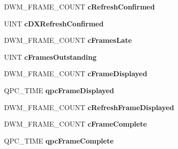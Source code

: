 \begin{DoxyCompactItemize}
D\+W\+M\+\_\+\+F\+R\+A\+M\+E\+\_\+\+C\+O\+U\+NT {\bfseries c\+Refresh\+Confirmed}
\item 
\mbox{\label{struct___d_w_m___t_i_m_i_n_g___i_n_f_o_a8c1790bb6485c12294e99a7412a6f594}} 
U\+I\+NT {\bfseries c\+D\+X\+Refresh\+Confirmed}
\item 
\mbox{\label{struct___d_w_m___t_i_m_i_n_g___i_n_f_o_a7238d2ad101d2a9b5f066f41c53abfab}} 
D\+W\+M\+\_\+\+F\+R\+A\+M\+E\+\_\+\+C\+O\+U\+NT {\bfseries c\+Frames\+Late}
\item 
\mbox{\label{struct___d_w_m___t_i_m_i_n_g___i_n_f_o_a7b3bc07f14ff355507aa1bfc4b049733}} 
U\+I\+NT {\bfseries c\+Frames\+Outstanding}
\item 
\mbox{\label{struct___d_w_m___t_i_m_i_n_g___i_n_f_o_ac4c513366b01405245adf92436f55d97}} 
D\+W\+M\+\_\+\+F\+R\+A\+M\+E\+\_\+\+C\+O\+U\+NT {\bfseries c\+Frame\+Displayed}
\item 
\mbox{\label{struct___d_w_m___t_i_m_i_n_g___i_n_f_o_ac02b071fa84081d15b2baf7ce699dab3}} 
Q\+P\+C\+\_\+\+T\+I\+ME {\bfseries qpc\+Frame\+Displayed}
\item 
\mbox{\label{struct___d_w_m___t_i_m_i_n_g___i_n_f_o_a09af01b73d4eb6acaeff7bbfc58d3792}} 
D\+W\+M\+\_\+\+F\+R\+A\+M\+E\+\_\+\+C\+O\+U\+NT {\bfseries c\+Refresh\+Frame\+Displayed}
\item 
\mbox{\label{struct___d_w_m___t_i_m_i_n_g___i_n_f_o_ab35b1e87ccfd5984610bc68525cd3a1e}} 
D\+W\+M\+\_\+\+F\+R\+A\+M\+E\+\_\+\+C\+O\+U\+NT {\bfseries c\+Frame\+Complete}
\item 
\mbox{\label{struct___d_w_m___t_i_m_i_n_g___i_n_f_o_a7886dacdb169d8fb9289cca3413f0cbd}} 
Q\+P\+C\+\_\+\+T\+I\+ME {\bfseries qpc\+Frame\+Complete}
\item 
\mbox{\label{struct___d_w_m___t_i_m_i_n_g___i_n_f_o_a322f1c99013b51283b35875fa4078e23}} 

\end{DoxyCompactItemize}
